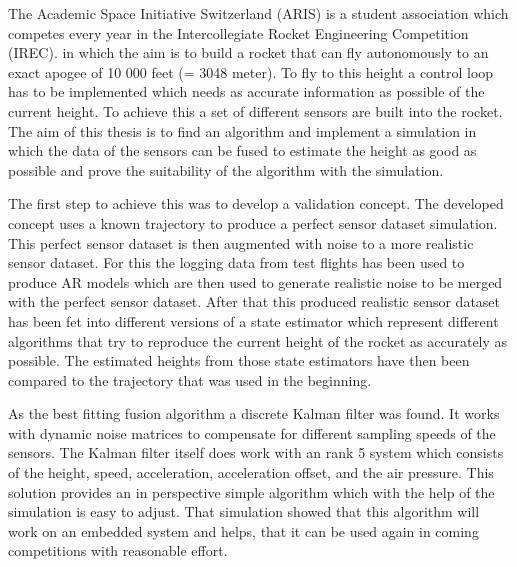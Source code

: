 The Academic Space Initiative Switzerland (ARIS) is a student association which competes every year in the Intercollegiate Rocket Engineering Competition (IREC).
in which the aim is to build a rocket that can fly autonomously to an exact apogee of 10 000 feet (= 3048 meter).
To fly to this height a control loop has to be implemented which needs as accurate information as possible of the current height.
To achieve this a set of different sensors are built into the rocket.
The aim of this thesis is to find an algorithm and implement a simulation in which the data of the sensors can be fused to estimate the height as good as possible and prove the suitability of the algorithm with the simulation.


The first step to achieve this was to develop a validation concept.
The developed concept uses a known trajectory to produce a perfect sensor dataset simulation.
This perfect sensor dataset is then augmented with noise to a more realistic sensor dataset.
For this the logging data from test flights has been used to produce AR models which are then used to generate realistic noise to be merged with the perfect sensor dataset.
After that this produced realistic sensor dataset has been fet into different versions of a state estimator which represent different algorithms that try to reproduce the current height of the rocket as accurately as possible.
The estimated heights from those state estimators have then been compared to the trajectory that was used in the beginning.


As the best fitting fusion algorithm a discrete Kalman filter was found.
It works with dynamic noise matrices to compensate for different sampling speeds of the sensors.
The Kalman filter itself does work with an rank 5 system which consists of the height, speed, acceleration, acceleration offset, and the air pressure.
This solution provides an in perspective simple algorithm which with the help of the simulation is easy to adjust.
That simulation showed that this algorithm will work on an embedded system and helps, that it can be used again in coming competitions with reasonable effort.
